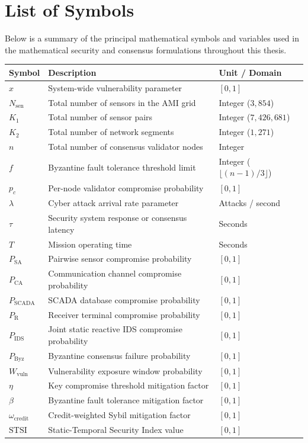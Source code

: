 \documentclass[12pt, oneside, a4paper]{report}
\theoremstyle{definition}
\theoremstyle{remark}
\newcommand{\Pbyz}{P_{\mathrm{Byz}}}
\newcommand{\Pids}{P_{\mathrm{IDS}}}
\newcommand{\Psa}{P_{\mathrm{SA}}}
\newcommand{\Pca}{P_{\mathrm{CA}}}
\newcommand{\Pscada}{P_{\mathrm{SCADA}}}
\renewcommand{\Pr}{P_{\mathrm{R}}}
\newcommand{\Wvuln}{W_{\mathrm{vuln}}}
\begin{document}
\chapter*{List of Symbols}

Below is a summary of the principal mathematical symbols and variables used in the mathematical security and consensus formulations throughout this thesis.

\vspace{1.0cm}

\begin{longtable}{lll}
\toprule
\textbf{Symbol} & \textbf{Description} & \textbf{Unit / Domain} \\
\midrule
$x$ & System-wide vulnerability parameter & $[0, 1]$ \\
$N_{\mathrm{sen}}$ & Total number of sensors in the AMI grid & Integer ($3{,}854$) \\
$K_1$ & Total number of sensor pairs & Integer ($7{,}426{,}681$) \\
$K_2$ & Total number of network segments & Integer ($1{,}271$) \\
$n$ & Total number of consensus validator nodes & Integer \\
$f$ & Byzantine fault tolerance threshold limit & Integer ($\lfloor (n-1)/3 \rfloor$) \\
$p_c$ & Per-node validator compromise probability & $[0, 1]$ \\
$\lambda$ & Cyber attack arrival rate parameter & Attacks / second \\
$\tau$ & Security system response or consensus latency & Seconds \\
$T$ & Mission operating time & Seconds \\
$\Psa$ & Pairwise sensor compromise probability & $[0, 1]$ \\
$\Pca$ & Communication channel compromise probability & $[0, 1]$ \\
$\Pscada$ & SCADA database compromise probability & $[0, 1]$ \\
$\Pr$ & Receiver terminal compromise probability & $[0, 1]$ \\
$\Pids$ & Joint static reactive IDS compromise probability & $[0, 1]$ \\
$\Pbyz$ & Byzantine consensus failure probability & $[0, 1]$ \\
$\Wvuln$ & Vulnerability exposure window probability & $[0, 1]$ \\
$\eta$ & Key compromise threshold mitigation factor & $[0, 1]$ \\
$\beta$ & Byzantine fault tolerance mitigation factor & $[0, 1]$ \\
$\omega_{\mathrm{credit}}$ & Credit-weighted Sybil mitigation factor & $[0, 1]$ \\
$\mathrm{STSI}$ & Static-Temporal Security Index value & $[0, 1]$ \\
\bottomrule
\end{longtable}
\end{document}

